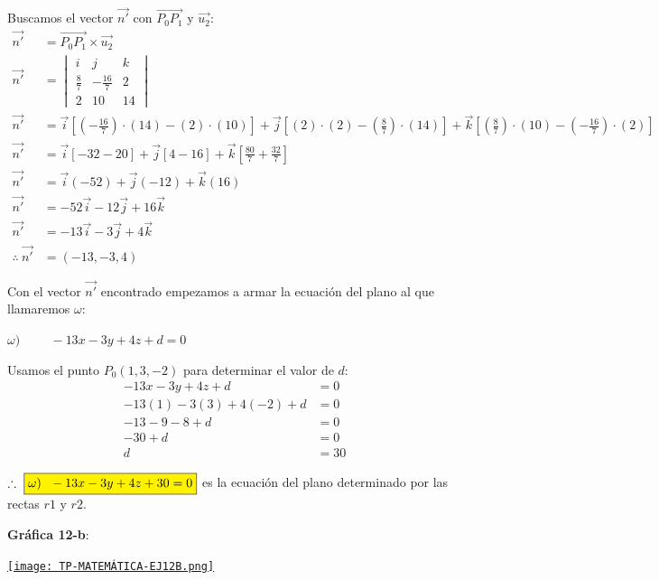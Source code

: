 \noindent Buscamos el vector $\vec{n'}$ con $\overrightarrow{P_0P_1}$ y $\vec{u_2}$:
\begin{align*}
	\vec{n'}              & = \overrightarrow{P_0P_1} \times \vec{u_2}                         \\
	\vec{n'}              & = \begin{vmatrix}
		                          i           & j             & k  \\
		                          \frac{8}{7} & -\frac{16}{7} & 2  \\
		                          2           & 10            & 14
	                          \end{vmatrix}                                 \\
	\vec{n'}              & = \vec{i} \left[(-\frac{16}{7})\cdot(14) - (2)\cdot(10) \right]  +
	\vec{j} \left[ (2)\cdot(2) - (\frac{8}{7})\cdot(14) \right] +
	\vec{k} \left[ (\frac{8}{7})\cdot(10) - (-\frac{16}{7})\cdot(2) \right]                    \\
	\vec{n'}              & = \vec{i} \left[-32 - 20 \right]  +
	\vec{j} \left[ 4 - 16 \right] +
	\vec{k} \left[ \frac{80}{7} + \frac{32}{7} \right]                                         \\
	\vec{n'}              & = \vec{i} (-52) + \vec{j} (- 12) + \vec{k} (16)                    \\
	\vec{n'}              & = -52\vec{i}- 12\vec{j} + 16\vec{k}                                \\
	\vec{n'}              & = -13\vec{i}- 3\vec{j} + 4\vec{k}                                  \\
	\therefore \ \vec{n'} & = \boxed{(-13, -3, 4)}
\end{align*}

\noindent Con el vector $\vec{n'}$ encontrado empezamos a armar la ecuación del plano al que llamaremos $\omega$:
\begin{center}
	$\omega) \hspace{1cm} -13x - 3y + 4z + d = 0$
\end{center}

\noindent Usamos el punto $P_0(1, 3, -2)$ para determinar el valor de $d$:
\begin{align*}
	-13x - 3y + 4z + d        & = 0          \\
	-13(1) - 3(3) + 4(-2) + d & = 0          \\
	-13 - 9 - 8 + d           & = 0          \\
	-30 + d                   & = 0          \\
	d                         & = \boxed{30}
\end{align*}

\noindent $\therefore \ \fcolorbox{black}{yellow}{$\omega) \ \ -13x - 3y + 4z + 30 = 0$}$ es la ecuación del plano determinado por las rectas $r1$ y $r2$.

\vspace{2cm}
\noindent \textbf{Gráfica 12-b}:
\begin{center}
	\href{https://www.geogebra.org/3d/n89vhber}{\texttt{[image: TP-MATEMÁTICA-EJ12B.png]}}
\end{center}